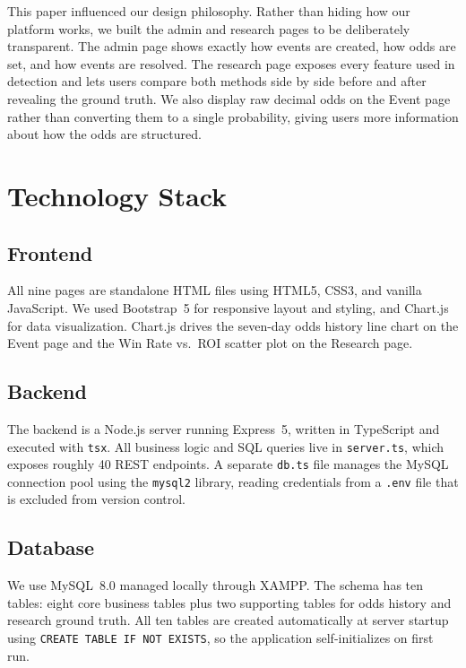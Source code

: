 \documentclass[sigconf,nonacm]{acmart}
\begin{document}
This paper influenced our design philosophy. Rather than hiding how
our platform works, we built the admin and research pages to be
deliberately transparent. The admin page shows exactly how events are
created, how odds are set, and how events are resolved. The research
page exposes every feature used in detection and lets users compare
both methods side by side before and after revealing the ground truth.
We also display raw decimal odds on the Event page rather than
converting them to a single probability, giving users more information
about how the odds are structured.

\section{Technology Stack}

\subsection{Frontend}
All nine pages are standalone HTML files using HTML5, CSS3, and vanilla
JavaScript. We used Bootstrap~5 for responsive layout and styling, and
Chart.js for data visualization. Chart.js drives the seven-day odds
history line chart on the Event page and the Win Rate vs.\ ROI scatter
plot on the Research page.

\subsection{Backend}
The backend is a Node.js server running Express~5, written in
TypeScript and executed with \texttt{tsx}. All business logic and SQL
queries live in \texttt{server.ts}, which exposes roughly 40 REST
endpoints. A separate \texttt{db.ts} file manages the MySQL connection
pool using the \texttt{mysql2} library, reading credentials from a
\texttt{.env} file that is excluded from version control.

\subsection{Database}
We use MySQL~8.0 managed locally through XAMPP. The schema has ten
tables: eight core business tables plus two supporting tables for odds
history and research ground truth. All ten tables are created
automatically at server startup using \texttt{CREATE TABLE IF NOT
EXISTS}, so the application self-initializes on first run.
\end{document}
